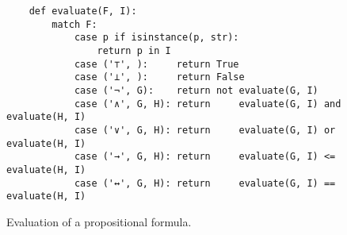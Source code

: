 \begin{figure}[!ht]
  \centering
\begin{verbatim}
    def evaluate(F, I):
        match F:
            case p if isinstance(p, str): 
                return p in I
            case ('⊤', ):     return True
            case ('⊥', ):     return False
            case ('¬', G):    return not evaluate(G, I)
            case ('∧', G, H): return     evaluate(G, I) and evaluate(H, I)
            case ('∨', G, H): return     evaluate(G, I) or  evaluate(H, I)
            case ('→', G, H): return     evaluate(G, I) <=  evaluate(H, I)
            case ('↔', G, H): return     evaluate(G, I) ==  evaluate(H, I)
\end{verbatim}
\vspace*{-0.3cm}
  \caption{Evaluation of a propositional formula.}
  \label{fig:evaluate.py}
\end{figure} 

